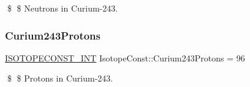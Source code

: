 \$ \$ Neutrons in Curium-\/243. \mbox{\label{group___isotope_const-_curium-_cm243_gaf56ee2bbc276e8b144049477aa9539a4}} 
\subsubsection{\texorpdfstring{Curium243\+Protons}{Curium243Protons}}
{\footnotesize\ttfamily \mbox{\hyperlink{group___isotope_const-_macros_ga5f18360b3e99483a35c32d789e62621c}{I\+S\+O\+T\+O\+P\+E\+C\+O\+N\+S\+T\+\_\+\+I\+NT}} Isotope\+Const\+::\+Curium243\+Protons = 96}

\$ \$ Protons in Curium-\/243. 